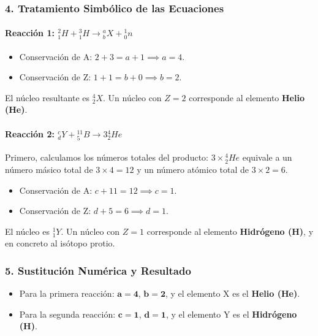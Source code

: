 \subsubsection*{4. Tratamiento Simbólico de las Ecuaciones}
\paragraph*{Reacción 1: ${}_{1}^{2}H+{}_{1}^{3}H \rightarrow {}_{b}^{a}X+{}_{0}^{1}n$}
\begin{itemize}
    \item Conservación de A: $2+3 = a+1 \implies a = 4$.
    \item Conservación de Z: $1+1 = b+0 \implies b = 2$.
\end{itemize}
El núcleo resultante es ${}_{2}^{4}X$. Un núcleo con $Z=2$ corresponde al elemento \textbf{Helio (He)}.

\paragraph*{Reacción 2: ${}_{d}^{c}Y+{}_{5}^{11}B \rightarrow 3{}_{2}^{4}He$}
Primero, calculamos los números totales del producto: $3 \times {}_{2}^{4}He$ equivale a un número másico total de $3 \times 4 = 12$ y un número atómico total de $3 \times 2 = 6$.
\begin{itemize}
    \item Conservación de A: $c+11 = 12 \implies c = 1$.
    \item Conservación de Z: $d+5 = 6 \implies d = 1$.
\end{itemize}
El núcleo es ${}_{1}^{1}Y$. Un núcleo con $Z=1$ corresponde al elemento \textbf{Hidrógeno (H)}, y en concreto al isótopo protio.

\subsubsection*{5. Sustitución Numérica y Resultado}
\begin{cajaresultado}
\begin{itemize}
    \item Para la primera reacción: $\boldsymbol{a=4}$, $\boldsymbol{b=2}$, y el elemento X es el \textbf{Helio (He)}.
    \item Para la segunda reacción: $\boldsymbol{c=1}$, $\boldsymbol{d=1}$, y el elemento Y es el \textbf{Hidrógeno (H)}.
\end{itemize}
\end{cajaresultado}

